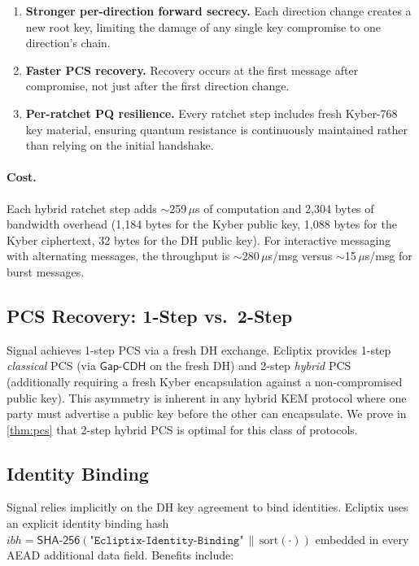 \documentclass[11pt,a4paper]{article}
\theoremstyle{definition}
\newcommand{\SHA}{\textsf{SHA-256}}
\newcommand{\GapCDH}{\textsf{Gap-CDH}}
\newcommand{\concat}{\,\|\,}
\begin{document}
\begin{enumerate}
  \item \textbf{Stronger per-direction forward secrecy.} Each direction change creates a new root key, limiting the damage of any single key compromise to one direction's chain.
  \item \textbf{Faster PCS recovery.} Recovery occurs at the first message after compromise, not just after the first direction change.
  \item \textbf{Per-ratchet PQ resilience.} Every ratchet step includes fresh Kyber-768 key material, ensuring quantum resistance is continuously maintained rather than relying on the initial handshake.
\end{enumerate}

\paragraph{Cost.}
Each hybrid ratchet step adds $\sim$259\,$\mu$s of computation and 2{,}304 bytes of bandwidth overhead (1{,}184 bytes for the Kyber public key, 1{,}088 bytes for the Kyber ciphertext, 32 bytes for the DH public key). For interactive messaging with alternating messages, the throughput is $\sim$280\,$\mu$s/msg versus $\sim$15\,$\mu$s/msg for burst messages.

\subsection{PCS Recovery: 1-Step vs.\ 2-Step}

Signal achieves 1-step PCS via a fresh DH exchange. Ecliptix provides 1-step \emph{classical} PCS (via $\GapCDH$ on the fresh DH) and 2-step \emph{hybrid} PCS (additionally requiring a fresh Kyber encapsulation against a non-compromised public key). This asymmetry is inherent in any hybrid KEM protocol where one party must advertise a public key before the other can encapsulate. We prove in \cref{thm:pcs} that 2-step hybrid PCS is optimal for this class of protocols.

\subsection{Identity Binding}

Signal relies implicitly on the DH key agreement to bind identities. Ecliptix uses an explicit identity binding hash $\mathit{ibh} = \SHA(\texttt{"Ecliptix-Identity-Binding"} \concat \mathrm{sort}(\cdot))$ embedded in every AEAD additional data field. Benefits include:
\end{document}
